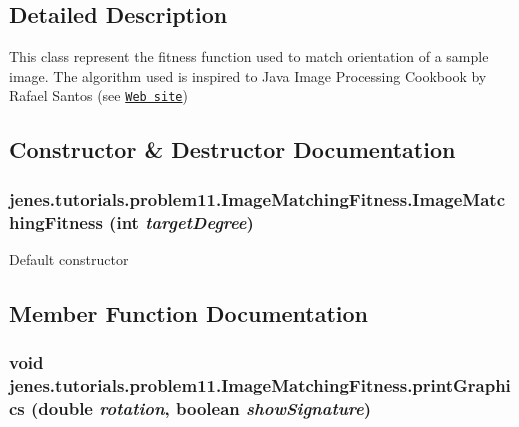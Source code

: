 \subsection{Detailed Description}
This class represent the fitness function used to match orientation of a sample image. The algorithm used is inspired to Java Image Processing Cookbook by Rafael Santos (see \href{http://www.lac.inpe.br/JIPCookbook/}{\tt Web site}) 

\subsection{Constructor \& Destructor Documentation}
\hypertarget{classjenes_1_1tutorials_1_1problem11_1_1_image_matching_fitness_b2d23d7e2f9d4cbb57d5818dbcf91e05}{
\subsubsection[ImageMatchingFitness]{\setlength{\rightskip}{0pt plus 5cm}jenes.tutorials.problem11.ImageMatchingFitness.ImageMatchingFitness (int {\em targetDegree})}}
\label{classjenes_1_1tutorials_1_1problem11_1_1_image_matching_fitness_b2d23d7e2f9d4cbb57d5818dbcf91e05}


Default constructor 

\subsection{Member Function Documentation}
\hypertarget{classjenes_1_1tutorials_1_1problem11_1_1_image_matching_fitness_57d1723f3fea82e96455935aefb360b9}{
\subsubsection[printGraphics]{\setlength{\rightskip}{0pt plus 5cm}void jenes.tutorials.problem11.ImageMatchingFitness.printGraphics (double {\em rotation}, \/  boolean {\em showSignature})}}
\label{classjenes_1_1tutorials_1_1problem11_1_1_image_matching_fitness_57d1723f3fea82e96455935aefb360b9}


